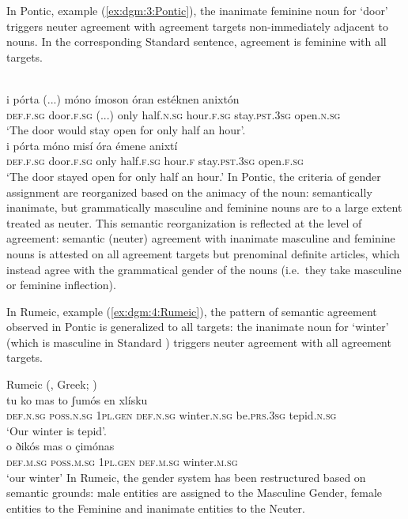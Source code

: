 \documentclass[output=collectionpaper]{langsci/langscibook}
\begin{document}
In Pontic, example (\ref{ex:dgm:3:Pontic}), the inanimate feminine noun for `door' triggers neuter agreement with agreement targets non-immediately adjacent to nouns. In the corresponding Standard  sentence, agreement is feminine with all targets.

\ea\label{ex:dgm:3:Pontic}
\ea
{}\\
\gll i p\'orta (...) m\'ono \'imoson \'oran est\'eknen anixt\'on \\
\textsc{def.f.sg} door.\textsc{f.sg} (...) only half.\textsc{n.sg} hour.\textsc{f.sg} stay.\textsc{pst.3sg} open\textsc{.n.sg} \\
\glt `The door would stay open for only half an hour'.
\ex
{}\\
\gll i p\'orta m\'ono mis\'i \'ora \'emene anixt\'i \\
\textsc{def.f.sg} door.\textsc{f.sg} only half\textsc{.f.sg} hour\textsc{.f} stay.\textsc{pst.3sg} open.\textsc{f.sg}\\
\glt `The door stayed open for only half an hour.'
\z
\z
In Pontic, the criteria of gender assignment are reorganized based on the animacy of the noun: semantically inanimate, but grammatically masculine and feminine nouns are to a large extent treated as neuter. This semantic reorganization is reflected at the level of agreement: semantic (neuter) agreement with inanimate masculine and feminine nouns is attested on all agreement targets but prenominal definite articles, which instead agree with the grammatical gender of the nouns (i.e.\ they take masculine or feminine inflection).

In Rumeic, example (\ref{ex:dgm:4:Rumeic}), the pattern of semantic agreement observed in Pontic is generalized to all targets: the inanimate noun for `winter' (which is masculine in Standard ) triggers neuter agreement with all agreement targets.

\ea\label{ex:dgm:4:Rumeic}
\ea
Rumeic (, Greek; \citealt[79]{Karatsareas2014})\\
\gll tu ko mas to ʃum\'os en xl\'isku\\
\textsc{def.n.sg} \textsc{poss.n.sg} \textsc{1pl.gen} \textsc{def.n.sg} winter.\textsc{n.sg} be.\textsc{prs.3sg} tepid.\textsc{n.sg}\\
\glt `Our winter is tepid'.
\ex
{}\\
\gll o ðik\'os mas o \c{c}im\'onas \\
\textsc{def.m.sg} \textsc{poss.m.sg} \textsc{1pl.gen} \textsc{def.m.sg} winter.\textsc{m.sg} \\
\glt `our winter'
\z
\z
In Rumeic, the gender system has been restructured based on semantic grounds: male entities are assigned to the Masculine Gender, female entities to the Feminine and inanimate entities to the Neuter.
\end{document}
